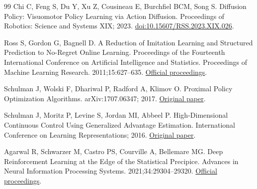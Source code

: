 \documentclass[
  american,
  11pt,
  a4paper,
]{article}
\begin{document}
\begin{thebibliography}{99}
Chi C, Feng S, Du Y, Xu Z, Cousineau E, Burchfiel BCM, Song S.
Diffusion Policy: Visuomotor Policy Learning via Action Diffusion.
Proceedings of Robotics: Science and Systems XIX; 2023.
\href{https://doi.org/10.15607/RSS.2023.XIX.026}{doi:10.15607/RSS.2023.XIX.026}.

Ross S, Gordon G, Bagnell D. A Reduction of Imitation Learning
and Structured Prediction to No-Regret Online Learning. Proceedings of
the Fourteenth International Conference on Artificial Intelligence and
Statistics. Proceedings of Machine Learning Research. 2011;15:627--635.
\href{https://proceedings.mlr.press/v15/ross11a.html}{Official
proceedings}.

Schulman J, Wolski F, Dhariwal P, Radford A, Klimov O. Proximal
Policy Optimization Algorithms. arXiv:1707.06347; 2017.
\href{https://arxiv.org/abs/1707.06347}{Original paper}.

Schulman J, Moritz P, Levine S, Jordan MI, Abbeel P.
High-Dimensional Continuous Control Using Generalized Advantage
Estimation. International Conference on Learning Representations; 2016.
\href{https://arxiv.org/abs/1506.02438}{Original paper}.

Agarwal R, Schwarzer M, Castro PS, Courville A, Bellemare MG.
Deep Reinforcement Learning at the Edge of the Statistical Precipice.
Advances in Neural Information Processing Systems. 2021;34:29304--29320.
\href{https://proceedings.neurips.cc/paper/2021/hash/f514cec81cb148559cf475e7426eed5e-Abstract.html}{Official
proceedings}.

\end{thebibliography}
\end{document}
